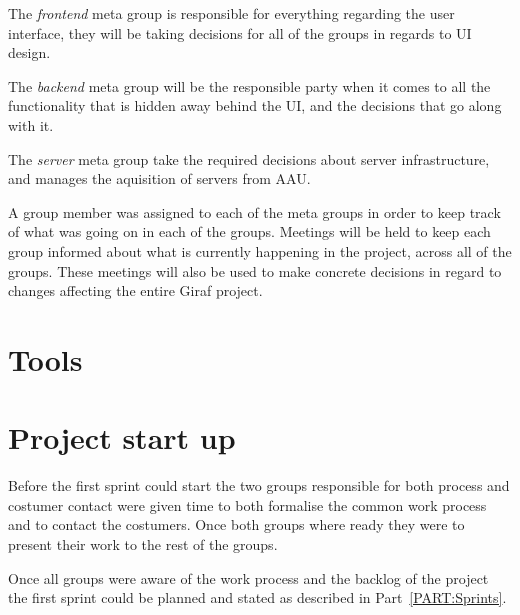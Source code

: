The \textit{frontend} meta group is responsible for everything regarding the user interface, they will be taking decisions for all of the groups in regards to UI design.

The \textit{backend} meta group will be the responsible party when it comes to all the functionality that is hidden away behind the UI, and the decisions that go along with it.

The \textit{server} meta group take the required decisions about server infrastructure, and manages the aquisition of servers from AAU.

A group member was assigned to each of the meta groups in order to keep track of what was going on in each of the groups. Meetings will be held to keep each group informed about what is currently happening in the project, across all of the groups. These meetings will also be used to make concrete decisions in regard to changes affecting the entire Giraf project.


\section{Tools}

\section{Project start up}
Before the first sprint could start the two groups responsible for both process and costumer contact were given time to both formalise the common work process and to contact the costumers.
Once both groups where ready they were to present their work to the rest of the groups.

Once all groups were aware of the work process and the backlog of the project the first sprint could be planned and stated as described in Part~\ref{PART:Sprints}.
